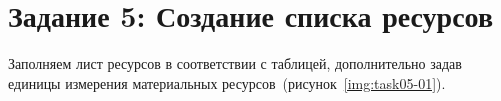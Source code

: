 \section{Задание 5: Создание списка ресурсов}

Заполняем лист ресурсов в соответствии с таблицей, дополнительно задав единицы
измерения материальных ресурсов~(рисунок~\ref{img:task05-01}).

